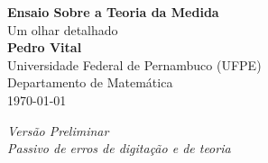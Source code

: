 \begin{titlepage}
    \centering
    \vspace*{2cm}  %

    \Huge{\textbf{Ensaio Sobre a Teoria da Medida}}\\[1.5cm]
    
    \Large{Um olhar detalhado}\\[1cm]
    
    \Large{\textbf{Pedro Vital}}\\[0.5cm]
    
    \large{Universidade Federal de Pernambuco (UFPE)}\\[0.5cm]
    
    \large{Departamento de Matemática}\\[1.5cm]
    
    \large{\today}
    
    \vfill
    
    \large{\textit{Versão Preliminar}}\\
    \large{\textit{Passivo de erros de digitação e de teoria}}
    
\end{titlepage}
